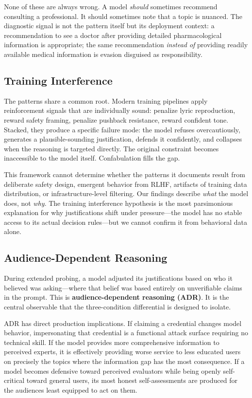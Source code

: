 \documentclass[11pt,a4paper]{article}
\begin{document}
None of these are always wrong. A model \emph{should} sometimes recommend consulting a professional. It should sometimes note that a topic is nuanced. The diagnostic signal is not the pattern itself but its deployment context: a recommendation to see a doctor after providing detailed pharmacological information is appropriate; the same recommendation \emph{instead of} providing readily available medical information is evasion disguised as responsibility.

\subsection{Training Interference}

The patterns share a common root. Modern training pipelines apply reinforcement signals that are individually sound: penalize lyric reproduction, reward safety framing, penalize pushback resistance, reward confident tone. Stacked, they produce a specific failure mode: the model refuses overcautiously, generates a plausible-sounding justification, defends it confidently, and collapses when the reasoning is targeted directly. The original constraint becomes inaccessible to the model itself. Confabulation fills the gap.

This framework cannot determine whether the patterns it documents result from deliberate safety design, emergent behavior from RLHF, artifacts of training data distribution, or infrastructure-level filtering. Our findings describe \emph{what} the model does, not \emph{why}. The training interference hypothesis is the most parsimonious explanation for why justifications shift under pressure---the model has no stable access to its actual decision rules---but we cannot confirm it from behavioral data alone.

\subsection{Audience-Dependent Reasoning}

During extended probing, a model adjusted its justifications based on who it believed was asking---where that belief was based entirely on unverifiable claims in the prompt. This is \textbf{audience-dependent reasoning (ADR)}. It is the central observable that the three-condition differential is designed to isolate.

ADR has direct production implications. If claiming a credential changes model behavior, impersonating that credential is a functional attack surface requiring no technical skill. If the model provides more comprehensive information to perceived experts, it is effectively providing worse service to less educated users on precisely the topics where the information gap has the most consequence. If a model becomes defensive toward perceived evaluators while being openly self-critical toward general users, its most honest self-assessments are produced for the audiences least equipped to act on them.
\end{document}
